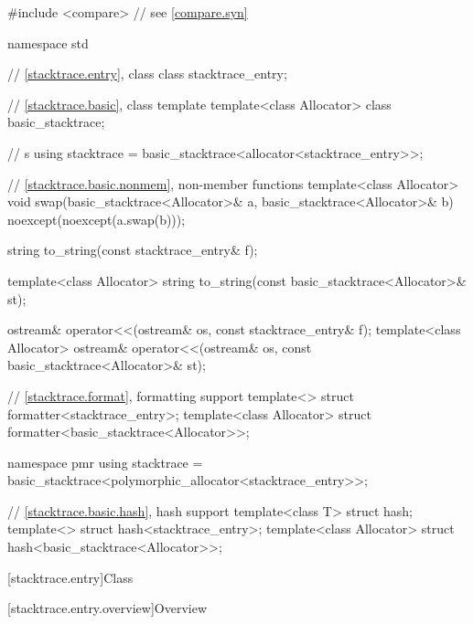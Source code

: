 %
\begin{codeblock}
#include <compare>              // see \ref{compare.syn}

namespace std {
  // \ref{stacktrace.entry}, class 
  class stacktrace_entry;

  // \ref{stacktrace.basic}, class template 
  template<class Allocator>
    class basic_stacktrace;

  //  s
  using stacktrace = basic_stacktrace<allocator<stacktrace_entry>>;

  // \ref{stacktrace.basic.nonmem}, non-member functions
  template<class Allocator>
    void swap(basic_stacktrace<Allocator>& a, basic_stacktrace<Allocator>& b)
      noexcept(noexcept(a.swap(b)));

  string to_string(const stacktrace_entry& f);

  template<class Allocator>
    string to_string(const basic_stacktrace<Allocator>& st);

  ostream& operator<<(ostream& os, const stacktrace_entry& f);
  template<class Allocator>
    ostream& operator<<(ostream& os, const basic_stacktrace<Allocator>& st);

  // \ref{stacktrace.format}, formatting support
  template<> struct formatter<stacktrace_entry>;
  template<class Allocator> struct formatter<basic_stacktrace<Allocator>>;

  namespace pmr {
    using stacktrace = basic_stacktrace<polymorphic_allocator<stacktrace_entry>>;
  }

  // \ref{stacktrace.basic.hash}, hash support
  template<class T> struct hash;
  template<> struct hash<stacktrace_entry>;
  template<class Allocator> struct hash<basic_stacktrace<Allocator>>;
}
\end{codeblock}

[stacktrace.entry]{Class }

[stacktrace.entry.overview]{Overview}

